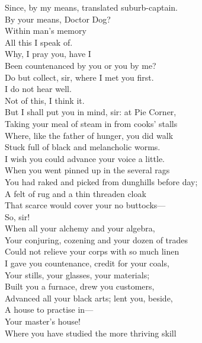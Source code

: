 \documentclass[a4paper,oneside,12pt]{memoir}
\begin{document}
\begin{drama*}
\subtlespeaks Since, by my means, translated suburb-captain.\\
\facespeaks By your means, Doctor Dog?\\
\subtlespeaks {} Within man's memory\\
All this I speak of.\\
\facespeaks {} Why, I pray you, have I\\
Been countenanced by you or you by me?\\
Do but collect, sir, where I met you first.\\
\subtlespeaks I do not hear well.\\
\facespeaks {} Not of this, I think it.\\
But I shall put you in mind, sir: at Pie Corner,\\
Taking your meal of steam in from cooks' stalls\\
Where, like the father of hunger, you did walk\\
Stuck full of black and melancholic worms.\\
\subtlespeaks I wish you could advance your voice a little.\\
\facespeaks When you went pinned up in the several rags\\
You had raked and picked from dunghills before day;\\
A felt of rug and a thin threaden cloak\\
That scarce would cover your no buttocks---\\
\subtlespeaks {} So, sir!\\
\facespeaks When all your alchemy and your algebra,\\
Your conjuring, cozening and your dozen of trades\\
Could not relieve your corps with so much linen\\
I gave you countenance, credit for your coals,\\
Your stills, your glasses, your materials;\\
Built you a furnace, drew you customers,\\
Advanced all your black arts; lent you, beside,\\
A house to practise in---\\
\subtlespeaks {} Your master's house!\\
\facespeaks Where you have studied the more thriving skill\\

\end{drama*}
\end{document}
